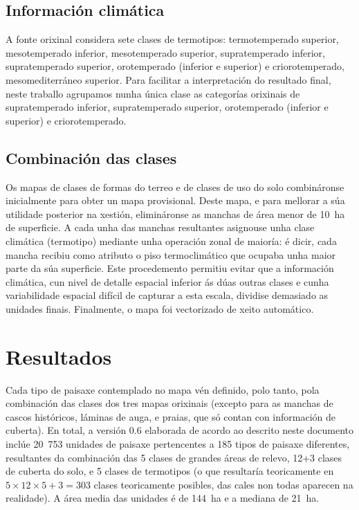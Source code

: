 \documentclass[11pt,a4paper]{article}
\begin{document}
\subsection{Información climática}

A fonte orixinal considera sete clases de termotipos: termotemperado superior, mesotemperado inferior, mesotemperado
superior, supratemperado inferior, supratemperado superior, orotemperado (inferior e superior) e criorotemperado, mesomediterráneo superior. Para facilitar a interpretación do resultado final, neste traballo agrupamos nunha única clase as categorías orixinais de supratemperado inferior, supratemperado superior, orotemperado (inferior e superior) e criorotemperado.

\subsection{Combinación das clases}

Os mapas de clases de formas do terreo e de clases de uso do solo combináronse inicialmente para obter un mapa provisional. Deste mapa, e para mellorar a súa utilidade posterior na xestión, elimináronse as manchas de área menor de 10~ha de superficie. A cada unha das manchas resultantes asignouse unha clase climática (termotipo) mediante unha operación zonal de maioría: é dicir, cada mancha recibiu como atributo o piso termoclimático que ocupaba unha maior parte da súa superficie. Este procedemento permitiu evitar que a información climática, cun nivel de detalle espacial inferior ás dúas outras clases e cunha variabilidade espacial difícil de capturar a esta escala, dividise demasiado as unidades finais. Finalmente, o mapa foi vectorizado de xeito automático.



\section{Resultados}

Cada tipo de paisaxe contemplado no mapa vén definido, polo tanto, pola combinación das clases dos tres mapas orixinais (excepto para as manchas de cascos históricos, láminas de auga, e praias, que só contan con información de cuberta). En total, a versión 0.6 elaborada de acordo ao descrito neste documento inclúe 20~753 unidades de paisaxe  pertencentes a 185 tipos de paisaxe diferentes, resultantes da combinación das 5 clases de grandes áreas de relevo, 12+3 clases de cuberta do solo, e 5 clases de termotipos (o que resultaría teoricamente en $5\times12\times5 + 3 = 303$ clases teoricamente posibles, das cales non todas aparecen na realidade). A área media das unidades é de 144~ha e a mediana de 21~ha.
\end{document}
